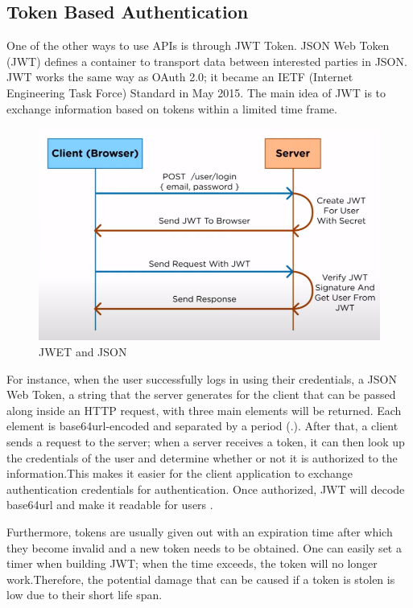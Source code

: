 \documentclass[11pt]{article}
\begin{document}
\subsection{Token Based Authentication}

One of the other ways to use APIs is through JWT Token. JSON Web Token (JWT) defines a container to transport data between interested parties in JSON. JWT works the same way as OAuth 2.0; it became an IETF (Internet Engineering Task Force) Standard in May 2015. The main idea of JWT is to exchange information based on tokens within a limited time frame.


\begin{figure}[!htbp]
    \centering
    \includegraphics[width=1\textwidth]{Capture.PNG}
    \caption{JWET and JSON \cite{siriwardena2014advanced}}
    \label{fig:Capture}
\end{figure}


For instance, when the user successfully logs in using their credentials, a JSON Web Token, a string that the server generates for the client that can be passed along inside an HTTP request, with three main elements will be returned. Each element is base64url-encoded and separated by a period (.). After that, a client sends a request to the server; when a server receives a token, it can then look up the credentials of the user and determine whether or not it is authorized to the information.This makes it easier for the client application to exchange authentication credentials for authentication. Once authorized, JWT will decode base64url and make it readable for users \cite{JSONWebT36:online}.

Furthermore, tokens are usually given out with an expiration time after which they become 
invalid and a new token needs to be obtained. One can easily set a timer when building JWT; when the time exceeds, the token will no longer work.Therefore, the potential damage that can be caused if a token is stolen is low due to their short life span. 
\end{document}
